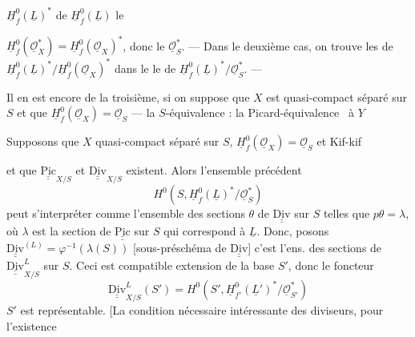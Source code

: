 \documentclass[11pt,a4paper]{article}
\begin{document}
$\underline{H}^{0}_{f}(\underline{L})^{*}$ de $\underline{H}^{0}_{f}(\underline{L})$  le 

$\underline{H}^{0}_{f}(\underline{\mathcal{O}}_{X}^{*}) = \underline{H}^{0}_{f}(\underline{\mathcal{O}}_{X})^{*}$, donc  le    $\underline{\mathcal{O}}_{S}^{*}$. --- Dans le deuxième cas, on trouve les \struck{\ill{}}  de $\underline{H}^{0}_{f}(\underline{L})^{*}/\underline{H}^{0}_{f}(\underline{\mathcal{O}}_{X})^{*}$ dans le  le  de $\underline{H}^{0}_{f}(\underline{L})^{*}/\underline{\mathcal{O}}_{S}^{*}$. ---

Il en est encore de \struck{\ill{}} \struck{\ill{}} \ill{} la troisième, si on suppose que $X$ est quasi-compact séparé sur $S$ et que $\underline{H}^{0}_{f}(\underline{\mathcal{O}}_{X}) = \underline{\mathcal{O}}_{S}$ --- \ill{} \ill{}  la $S$-équivalence   : la Picard-équivalence \ à $Y$

Supposons  que
$X$ quasi-compact séparé sur $S$, $\underline{H}^{0}_{f}(\underline{\mathcal{O}}_{X}) = \underline{\mathcal{O}}_{S}$ et Kif-kif  

et que $\underline{\underline{\mathrm{Pic}}}_{X/S}$ et $\underline{\underline{\mathrm{Div}}}_{X/S}$ existent. Alors l'ensemble précédent
\[
H^{0}(S, \underline{H}^{0}_{f}(\underline{L})^{*}/\underline{\mathcal{O}}_{S}^{*})
\]
peut s'interpréter comme l'ensemble des sections $\theta$ de $\underline{\underline{\mathrm{Div}}}$ sur $S$ telles que $p\theta = \lambda$, où $\lambda$ est la section de $\underline{\underline{\mathrm{Pic}}}$ sur $S$ qui correspond à $\underline{L}$. Donc, posons $\underline{\underline{\mathrm{Div}}}^{(L)} = \varphi^{-1}(\lambda(S))$ [sous-préschéma de $\underline{\underline{\mathrm{Div}}}$] c'est l'ens. des sections de $\underline{\underline{\mathrm{Div}}}^{L}_{X/S}$ sur $S$. \struck{\ill{}} Ceci est compatible \ill{} extension de la base $S'$, donc le foncteur
\[
\underline{\underline{\mathrm{Div}}}^{L}_{X/S}(S') = H^{0}(S', \underline{H}^{0}_{f'}(\underline{L}')^{*}/\underline{\mathcal{O}}_{S'}^{*})
\]
\ill{} $S'$ est représentable.  [La  \ill{} \ill{} condition nécessaire intéressante \ill{}  des diviseurs, pour l'existence



\end{document}
